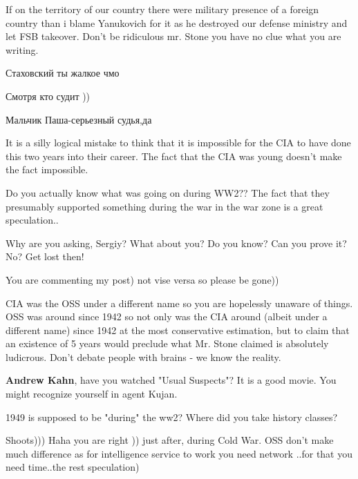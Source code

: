 \begin{itemize}
If on the territory of our country there were military presence of a foreign
country than i blame Yanukovich for it as he destroyed our defense ministry and
let FSB takeover. Don't be ridiculous mr. Stone you have no clue what you are
writing.

\begin{itemize} %
Стаховский ты жалкое чмо


Смотря кто судит ))

Мальчик Паша-серьезный судья,да


It is a silly logical mistake to think that it is impossible for the CIA to
have done this two years into their career. The fact that the CIA was young
doesn't make the fact impossible.


Do you actually know what was going on during WW2?? The fact that they
presumably supported something during the war in the war zone is a great
speculation..


Why are you asking, Sergiy? What about you? Do you know? Can you prove it? No?
Get lost then!


You are commenting my post) not vise versa so please be gone))


CIA was the OSS under a different name so you are hopelessly unaware of things.
OSS was around since 1942 so not only was the CIA around (albeit under a
different name) since 1942 at the most conservative estimation, but to claim
that an existence of 5 years would preclude what Mr. Stone claimed is
absolutely ludicrous. Don't debate people with brains - we know the reality.

\textbf{Andrew Kahn}, have you watched "Usual Suspects"? It is a good movie. You might recognize yourself in agent Kujan.

1949 is supposed to be "during" the ww2? Where did you take history classes?


Shoots))) Haha you are right )) just after, during Cold War. OSS don't make
much difference as for intelligence service to work you need network ..for that
you need time..the rest speculation)


\end{itemize}
\end{itemize}
